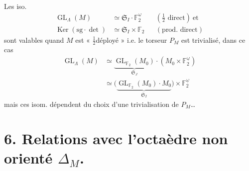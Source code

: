 \documentclass[11pt,a4paper]{article}
\begin{document}
Les iso.
\[
  \begin{aligned}
    \operatorname{GL}_\Lambda(M) &\simeq \mathfrak{S}_I \cdot \mathbb{F}_2^{\underline{\omega}} && (\tfrac12\text{ direct}) \ \text{et} \\
    \operatorname{Ker}(\mathrm{sg} \cdot \det) &\simeq \mathfrak{S}_I \times \mathbb{F}_2 && (\text{prod. direct})
  \end{aligned}
\]
sont valables quand $M$ est « $\tfrac12$déployé » i.e. le torseur $P_M$ est trivialisé, dans ce cas
\[
  \begin{aligned}
  \operatorname{GL}_\Lambda(M) &\simeq \underset{\mathfrak{S}_J}{\underbrace{\operatorname{GL}_{\mathbb{F}_2}(M_0)}} \cdot (M_0 \times \mathbb{F}_2^{\underline{\omega}}) \\
  &\simeq \bigl(\underset{\mathfrak{S}_I}{\underbrace{\operatorname{GL}_{\mathbb{F}_2}(M_0) \cdot M_0}}\bigr) \times \mathbb{F}_2^{\underline{\omega}}
  \end{aligned}
\]
mais ces isom. dépendent du choix d'une trivialisation de $P_M$\ldots
{}

\section{6. Relations avec l'octaèdre non orienté $\Delta_M$.}
\end{document}
